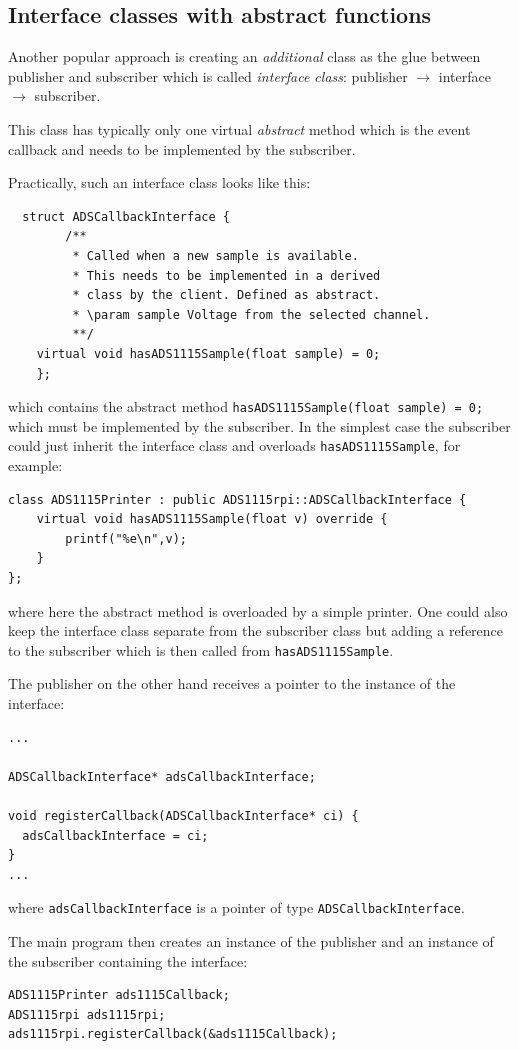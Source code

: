 \documentclass[12pt]{report}
\begin{document}
\subsection{Interface classes with abstract functions}
Another popular approach is creating an \textsl{additional} class as the glue between
publisher and subscriber which is called \textsl{interface
  class}: publisher $\to$ interface $\to$ subscriber.

This class has typically only one virtual \textsl{abstract} method which is
the event callback and needs to be implemented by the subscriber.

Practically, such an interface class looks like this:
\begin{verbatim}
  struct ADSCallbackInterface {
	    /**
	     * Called when a new sample is available.
	     * This needs to be implemented in a derived
	     * class by the client. Defined as abstract.
	     * \param sample Voltage from the selected channel.
	     **/
	virtual void hasADS1115Sample(float sample) = 0;
    };
\end{verbatim}
which contains the abstract method \texttt{hasADS1115Sample(float sample) = 0;}
which must be implemented by the subscriber.
In the simplest case the subscriber could just inherit the interface
class and overloads \texttt{hasADS1115Sample},
for example:
\begin{verbatim}
class ADS1115Printer : public ADS1115rpi::ADSCallbackInterface {
	virtual void hasADS1115Sample(float v) override {
		printf("%e\n",v);
	}
};
\end{verbatim}
where here the abstract method is overloaded by a simple printer. One could
also keep the interface class separate from the subscriber class but adding
a reference to the subscriber which is then called from \texttt{hasADS1115Sample}.

The publisher on the other hand receives a pointer to the instance of the interface:
\begin{verbatim}
...

ADSCallbackInterface* adsCallbackInterface;

void registerCallback(ADSCallbackInterface* ci) {
  adsCallbackInterface = ci;
}
...
\end{verbatim}
where \texttt{adsCallbackInterface} is a pointer of type
\texttt{ADSCallbackInterface}.

The main program then creates an instance of the publisher and an instance of the subscriber
containing the interface:
\begin{verbatim}
ADS1115Printer ads1115Callback;
ADS1115rpi ads1115rpi;
ads1115rpi.registerCallback(&ads1115Callback);
\end{verbatim}
\end{document}
